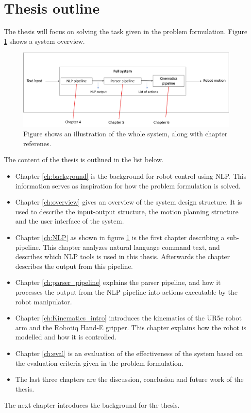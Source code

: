 \section{Thesis outline}
The thesis will focus on solving the task given in the problem formulation. Figure \ref{fig:thesis_outline} shows a system overview.

\begin{figure}[ht]
    \centering
    \includegraphics[width=15cm]{img/thesis_outline.png}
    \caption{Figure shows an illustration of the whole system, along with chapter referenes.}
    \label{fig:thesis_outline}
\end{figure}

The content of the thesis is outlined in the list below.
\begin{itemize}
    \item Chapter \ref{ch:background} is the background for robot control using NLP. This information serves as inspiration for how the problem formulation is solved.
    \item Chapter \ref{ch:overview} gives an overview of the system design structure. It is used to describe the input-output structure, the motion planning structure and the user interface of the system.
    \item Chapter \ref{ch:NLP} as shown in figure \ref{fig:thesis_outline} is the first chapter describing a sub-pipeline. This chapter analyzes natural language command text, and describes which NLP tools is used in this thesis. Afterwards the chapter describes the output from this pipeline.
    \item Chapter \ref{ch:parser_pipeline} explains the parser pipeline, and how it processes the output from the NLP pipeline into actions executable by the robot manipulator.
    \item Chapter \ref{ch:Kinematics_intro} introduces the kinematics of the UR5e robot arm and the Robotiq Hand-E gripper. This chapter explains how the robot is modelled and how it is controlled.
    \item Chapter \ref{ch:eval} is an evaluation of the effectiveness of the system based on the evaluation criteria given in the problem formulation. 
    \item The last three chapters are the discussion, conclusion and future work of the thesis.
\end{itemize}

The next chapter introduces the background for the thesis.